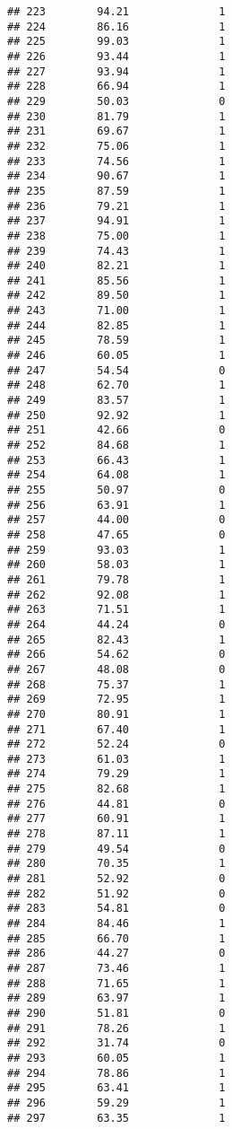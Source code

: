 \documentclass[
]{article}
\begin{document}
\begin{verbatim}
## 223        94.21              1
## 224        86.16              1
## 225        99.03              1
## 226        93.44              1
## 227        93.94              1
## 228        66.94              1
## 229        50.03              0
## 230        81.79              1
## 231        69.67              1
## 232        75.06              1
## 233        74.56              1
## 234        90.67              1
## 235        87.59              1
## 236        79.21              1
## 237        94.91              1
## 238        75.00              1
## 239        74.43              1
## 240        82.21              1
## 241        85.56              1
## 242        89.50              1
## 243        71.00              1
## 244        82.85              1
## 245        78.59              1
## 246        60.05              1
## 247        54.54              0
## 248        62.70              1
## 249        83.57              1
## 250        92.92              1
## 251        42.66              0
## 252        84.68              1
## 253        66.43              1
## 254        64.08              1
## 255        50.97              0
## 256        63.91              1
## 257        44.00              0
## 258        47.65              0
## 259        93.03              1
## 260        58.03              1
## 261        79.78              1
## 262        92.08              1
## 263        71.51              1
## 264        44.24              0
## 265        82.43              1
## 266        54.62              0
## 267        48.08              0
## 268        75.37              1
## 269        72.95              1
## 270        80.91              1
## 271        67.40              1
## 272        52.24              0
## 273        61.03              1
## 274        79.29              1
## 275        82.68              1
## 276        44.81              0
## 277        60.91              1
## 278        87.11              1
## 279        49.54              0
## 280        70.35              1
## 281        52.92              0
## 282        51.92              0
## 283        54.81              0
## 284        84.46              1
## 285        66.70              1
## 286        44.27              0
## 287        73.46              1
## 288        71.65              1
## 289        63.97              1
## 290        51.81              0
## 291        78.26              1
## 292        31.74              0
## 293        60.05              1
## 294        78.86              1
## 295        63.41              1
## 296        59.29              1
## 297        63.35              1

\end{verbatim}
\end{document}

